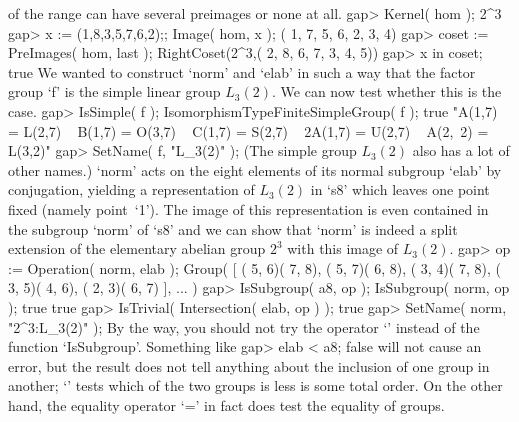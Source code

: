 of the range can have several preimages or none at all.
\beginexample
    gap> Kernel( hom );
    2^3
    gap> x := (1,8,3,5,7,6,2);; Image( hom, x );
    ( 1, 7, 5, 6, 2, 3, 4)
    gap> coset := PreImages( hom, last );
    RightCoset(2^3,( 2, 8, 6, 7, 3, 4, 5))
    gap> x in coset;
    true
\endexample
We  wanted to construct  `norm' and `elab' in such  a way that the factor
group `f'  is the simple linear group  $L_3(2)$. We  can now test whether
this is the case.
\beginexample
    gap> IsSimple( f ); IsomorphismTypeFiniteSimpleGroup( f );
    true
    "A(1,7) = L(2,7) ~ B(1,7) = O(3,7) ~ C(1,7) = S(2,7) ~ 2A(1,7) = U(2,7) ~ A(2,\
    2) = L(3,2)"
    gap> SetName( f, "L_3(2)" );
\endexample
(The simple group $L_3(2)$ also has a lot of other names.) `norm' acts on
the eight elements of its normal subgroup `elab' by conjugation, yielding
a representation of $L_3(2)$ in `s8' which leaves one point fixed (namely
point~`1').  The image of this  representation  is even contained in  the
subgroup `norm'  of `s8' and we  can show that  `norm' is indeed  a split
extension of   the  elementary abelian group   $2^3$ with  this image  of
$L_3(2)$.
\beginexample
    gap> op := Operation( norm, elab );
    Group( [ ( 5, 6)( 7, 8), ( 5, 7)( 6, 8), ( 3, 4)( 7, 8), ( 3, 5)( 4, 6), 
      ( 2, 3)( 6, 7) ], ... )
    gap> IsSubgroup( a8, op ); IsSubgroup( norm, op );
    true
    true
    gap> IsTrivial( Intersection( elab, op ) );
    true
    gap> SetName( norm, "2^3:L_3(2)" );
\endexample
By the way, you should not try the operator `\<'  instead of the function
`IsSubgroup'. Something like
\beginexample
    gap> elab < a8;
    false
\endexample
will not cause an error, but the result does not  tell anything about the
inclusion of one group in another; `\<' tests  which of the two groups is
less is some total order. On the other hand, the equality operator `=' in
fact does test the equality of groups.

\Section{Operations!of groups}

